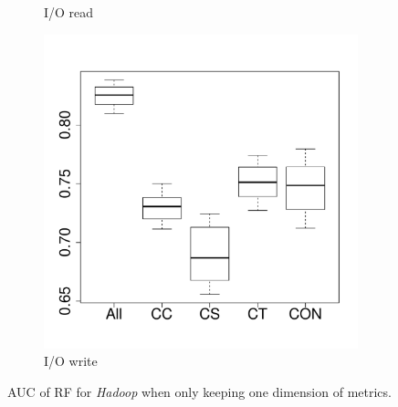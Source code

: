 \documentclass[10pt,journal,compsoc]{IEEEtran}
\begin{document}
\begin{figure}[t]
\begin{subfigure}{0.19\textwidth}
                \caption{I/O read}
        \end{subfigure}
        \begin{subfigure}{0.19\textwidth}
                \includegraphics[width=\linewidth]{Figures/iowrite-hadoopkeep-importance.pdf}
                \caption{I/O write}
        \end{subfigure}
        
	\caption{AUC of RF for \emph{Hadoop} when only keeping one dimension of metrics.}
	\label{fig:importance-dimenssion-keep-hadoop}
\end{figure}
\end{document}
